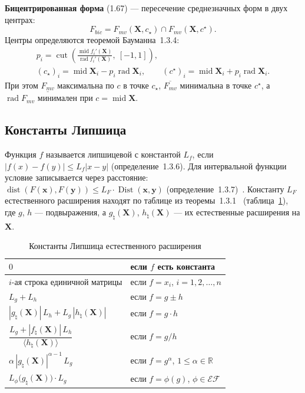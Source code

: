 \documentclass[a4paper, 14pt]{extarticle}
\begin{document}
\textbf{Бицентрированная форма} (1.67) --- пересечение среднезначных форм в двух центрах:
\begin{equation*}
    F_{bic} = F_{mv}(\mathbf{X}, c_\star) \cap F_{mv}(\mathbf{X}, c^\star).
\end{equation*}
Центры определяются теоремой Бауманна~1.3.4:
\begin{gather*}
    p_i = \operatorname{cut}\!\left(\frac{\operatorname{mid}f_i'(\mathbf{X})}{\operatorname{rad}f_i'(\mathbf{X})},\ [-1, 1]\right),\\
    (c_\star)_i = \operatorname{mid}\mathbf{X}_i - p_i\operatorname{rad}\mathbf{X}_i,\qquad
    (c^\star)_i = \operatorname{mid}\mathbf{X}_i + p_i\operatorname{rad}\mathbf{X}_i.
\end{gather*}
При этом $\underline{F_{mv}}$ максимальна по $c$ в точке $c_\star$, $\overline{F_{mv}}$ минимальна в точке $c^\star$, а $\operatorname{rad}F_{mv}$ минимален при $c = \operatorname{mid}\mathbf{X}$.

\subsection{Константы Липшица}

Функция $f$ называется липшицевой с константой $L_f$, если $|f(x) - f(y)| \le L_f|x - y|$ (определение~1.3.6). Для интервальной функции условие записывается через расстояние: $\operatorname{dist}(F(\mathbf{x}), F(\mathbf{y})) \le L_F\cdot\operatorname{Dist}(\mathbf{x}, \mathbf{y})$ (определение~1.3.7)~\cite[с.~69]{bazhenov}. Константу $L_F$ естественного расширения находят по таблице из теоремы~1.3.1~\cite[с.~67]{bazhenov} (таблица~\ref{tab:lip}), где $g$, $h$ --- подвыражения, а $g_\natural(\mathbf{X})$, $h_\natural(\mathbf{X})$ --- их естественные расширения на $\mathbf{X}$.

\begin{table}[H]
    \centering
    \caption{Константы Липшица естественного расширения}
    \label{tab:lip}
    \begin{tabular}{|l|l|}
        \hline
        $0$ & если $f$ есть константа \\ \hline
        $i$-ая строка единичной матрицы & если $f = x_i$, $i = 1, 2, \dots, n$ \\ \hline
        $L_g + L_h$ & если $f = g \pm h$ \\ \hline
        $|g_\natural(\mathbf{X})|\,L_h + L_g\,|h_\natural(\mathbf{X})|$ & если $f = g \cdot h$ \\ \hline
        $\dfrac{L_g + |f_\natural(\mathbf{X})|\,L_h}{\langle h_\natural(\mathbf{X})\rangle}$ & если $f = g / h$ \\ \hline
        $\alpha\,|g_\natural(\mathbf{X})|^{\alpha-1}\,L_g$ & если $f = g^\alpha$, $1 \le \alpha \in \mathbb{R}$ \\ \hline
        $L_\phi\bigl(g_\natural(\mathbf{X})\bigr)\cdot L_g$ & если $f = \phi(g)$, $\phi \in \mathcal{EF}$ \\ \hline
    \end{tabular}
\end{table}
\end{document}
